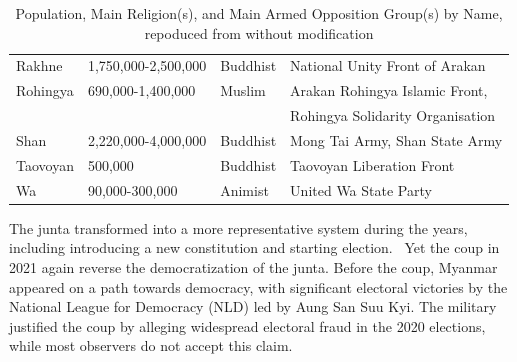 \documentclass{article}
\begin{document}
\begin{table}[H]
\begin{tabular}{@{}lllp{5.5cm}@{}}
Rakhne  & 1,750,000-2,500,000 & Buddhist           & National Unity Front of Arakan \\
Rohingya& 690,000-1,400,000   & Muslim             & Arakan Rohingya Islamic Front, \\
        &                     &                    & Rohingya Solidarity Organisation \\
Shan    & 2,220,000-4,000,000 & Buddhist           & Mong Tai Army, Shan State Army \\
Taovoyan& 500,000             & Buddhist           & Taovoyan Liberation Front \\
Wa      & 90,000-300,000      & Animist            & United Wa State Party \\
\bottomrule
\end{tabular}
\caption{Population, Main Religion(s), and Main Armed Opposition Group(s) by Name, repoduced from \textcite[34]{smithEthnicGroupsBurma1994} without modification}
\label{grouptable}
\end{table}

The junta transformed into a more representative system during the years, including introducing a new constitution and starting election.~\autocite[276-285]{aung-thwinHistoryMyanmarAncient2012} Yet the coup in 2021 again reverse the democratization of the junta. Before the coup, Myanmar appeared on a path towards democracy, with significant electoral victories by the National League for Democracy (NLD) led by Aung San Suu Kyi. The military justified the coup by alleging widespread electoral fraud in the 2020 elections, while most observers do not accept this claim.\autocite{ganesanMyanmar2021Military2023}

\printbibliography{}
\end{document}
